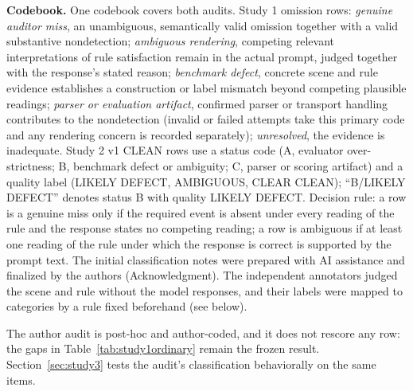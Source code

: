 \documentclass{ieeeaccess}
\begin{document}
\textbf{Codebook.} One codebook covers both audits. Study 1 omission rows: \emph{genuine auditor miss}, an unambiguous, semantically valid omission together with a valid substantive nondetection; \emph{ambiguous rendering}, competing relevant interpretations of rule satisfaction remain in the actual prompt, judged together with the response's stated reason; \emph{benchmark defect}, concrete scene and rule evidence establishes a construction or label mismatch beyond competing plausible readings; \emph{parser or evaluation artifact}, confirmed parser or transport handling contributes to the nondetection (invalid or failed attempts take this primary code and any rendering concern is recorded separately); \emph{unresolved}, the evidence is inadequate. Study 2 v1 CLEAN rows use a status code (A, evaluator over-strictness; B, benchmark defect or ambiguity; C, parser or scoring artifact) and a quality label (LIKELY DEFECT, AMBIGUOUS, CLEAR CLEAN); ``B/LIKELY DEFECT'' denotes status B with quality LIKELY DEFECT. Decision rule: a row is a genuine miss only if the required event is absent under every reading of the rule and the response states no competing reading; a row is ambiguous if at least one reading of the rule under which the response is correct is supported by the prompt text. The initial classification notes were prepared with AI assistance and finalized by the authors (Acknowledgment). The independent annotators judged the scene and rule without the model responses, and their labels were mapped to categories by a rule fixed beforehand (see below).

The author audit is post-hoc and author-coded, and it does not rescore any row: the gaps in Table~\ref{tab:study1ordinary} remain the frozen result. Section~\ref{sec:study3} tests the audit's classification behaviorally on the same items.
\end{document}
